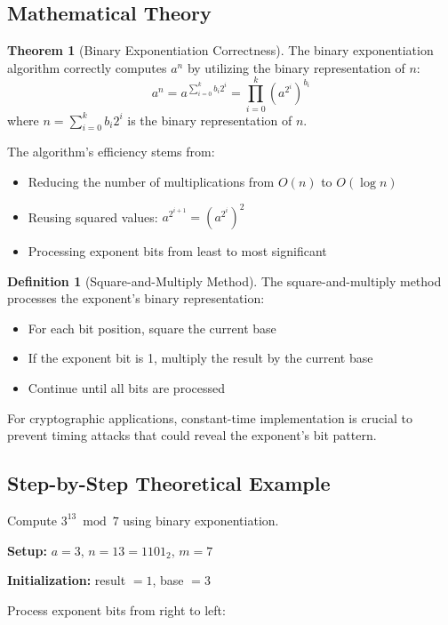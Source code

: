 \documentclass[12pt,a4paper]{article}
\theoremstyle{definition}
\newtheorem{definition}{Definition}[section]
\newtheorem{theorem}{Theorem}[section]
\begin{document}
\subsection{Mathematical Theory}

\begin{theorem}[Binary Exponentiation Correctness]
The binary exponentiation algorithm correctly computes $a^n$ by utilizing the binary representation of $n$:
\[a^n = a^{\sum_{i=0}^{k} b_i 2^i} = \prod_{i=0}^{k} (a^{2^i})^{b_i}\]
where $n = \sum_{i=0}^{k} b_i 2^i$ is the binary representation of $n$.
\end{theorem}

The algorithm's efficiency stems from:
\begin{itemize}
    \item Reducing the number of multiplications from $O(n)$ to $O(\log n)$
    \item Reusing squared values: $a^{2^{i+1}} = (a^{2^i})^2$  
    \item Processing exponent bits from least to most significant
\end{itemize}

\begin{definition}[Square-and-Multiply Method]
The square-and-multiply method processes the exponent's binary representation:
\begin{itemize}
    \item For each bit position, square the current base
    \item If the exponent bit is 1, multiply the result by the current base
    \item Continue until all bits are processed
\end{itemize}
\end{definition}

For cryptographic applications, constant-time implementation is crucial to prevent timing attacks that could reveal the exponent's bit pattern.

\subsection{Step-by-Step Theoretical Example}

Compute $3^{13} \bmod 7$ using binary exponentiation.

\textbf{Setup:} $a = 3$, $n = 13 = 1101_2$, $m = 7$

\textbf{Initialization:} result $= 1$, base $= 3$

Process exponent bits from right to left:
\end{document}
